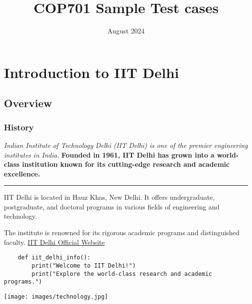 \documentclass{article}
\title{COP701 Sample Test cases}
\date{August 2024}
\begin{document}
\section{Introduction to IIT Delhi}
\subsection{Overview}
\subsubsection{History}

\textit{Indian Institute of Technology Delhi (IIT Delhi) is one of the premier engineering institutes in India.}
\textbf{Founded in 1961, IIT Delhi has grown into a world-class institution known for its cutting-edge research and academic excellence.}


\hrule

IIT Delhi is located in Hauz Khas, New Delhi. It offers undergraduate, postgraduate, and doctoral programs in various fields of engineering and technology.
\par
The institute is renowned for its rigorous academic programs and distinguished faculty.
\href{https://www.iitd.ac.in}{IIT Delhi Official Website}

\begin{verbatim}
    def iit_delhi_info():
        print("Welcome to IIT Delhi!")
        print("Explore the world-class research and academic programs.")
\end{verbatim}

\texttt{[image: images/technology.jpg]}
\end{document}
